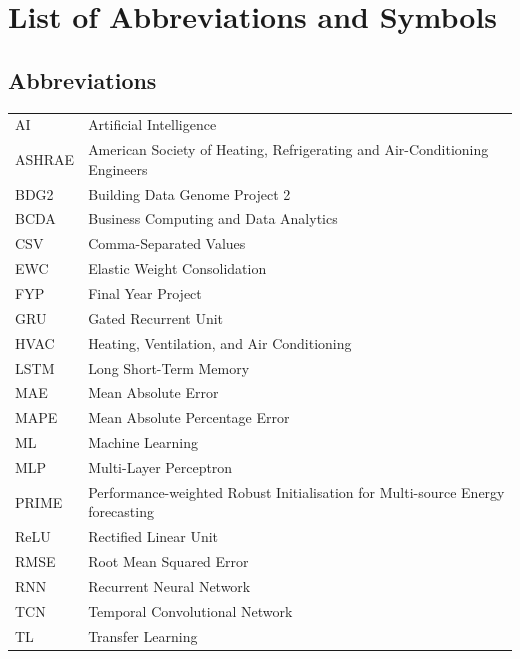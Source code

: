 \documentclass[12pt,a4paper]{report}
\begin{document}
\clearpage

\tableofcontents
\clearpage

\listoffigures
\clearpage

\listoftables
\clearpage

\chapter*{List of Abbreviations and Symbols}

\section*{Abbreviations}
\begin{tabular}{ll}
AI & Artificial Intelligence \\
ASHRAE & American Society of Heating, Refrigerating and Air-Conditioning Engineers \\
BDG2 & Building Data Genome Project 2 \\
BCDA & Business Computing and Data Analytics \\
CSV & Comma-Separated Values \\
EWC & Elastic Weight Consolidation \\
FYP & Final Year Project \\
GRU & Gated Recurrent Unit \\
HVAC & Heating, Ventilation, and Air Conditioning \\
LSTM & Long Short-Term Memory \\
MAE & Mean Absolute Error \\
MAPE & Mean Absolute Percentage Error \\
ML & Machine Learning \\
MLP & Multi-Layer Perceptron \\
PRIME & Performance-weighted Robust Initialisation for Multi-source Energy forecasting \\
ReLU & Rectified Linear Unit \\
RMSE & Root Mean Squared Error \\
RNN & Recurrent Neural Network \\
TCN & Temporal Convolutional Network \\
TL & Transfer Learning \\
\end{tabular}
\end{document}
